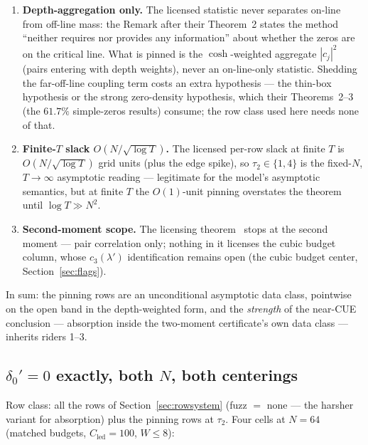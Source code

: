 \documentclass[11pt]{article}
\theoremstyle{plain}
\theoremstyle{definition}
\theoremstyle{remark}
\newcommand{\Cled}{C_{\mathrm{led}}}
\begin{document}
\begin{enumerate}
\item \textbf{Depth-aggregation only.} The licensed statistic never separates
  on-line from off-line mass: the Remark after their Theorem~2 states the method
  ``neither requires nor provides any information'' about whether the zeros are on
  the critical line. What is pinned is the $\cosh$-weighted aggregate $|c_j|^2$
  (pairs entering with depth weights), never an on-line-only statistic. Shedding
  the far-off-line coupling term costs an extra hypothesis --- the thin-box
  hypothesis or the strong zero-density hypothesis, which their Theorems~2--3 (the
  $61.7\%$ simple-zeros results) consume; the row class used here needs none of
  that.
\item \textbf{Finite-$T$ slack $O(N/\sqrt{\log T})$.} The licensed per-row slack
  at finite $T$ is $O(N/\sqrt{\log T})$ grid units (plus the edge spike), so
  $\tau_2 \in \{1, 4\}$ is the fixed-$N$, $T \to \infty$ asymptotic reading ---
  legitimate for the model's asymptotic semantics, but at finite $T$ the
  $O(1)$-unit pinning overstates the theorem until $\log T \gg N^2$.
\item \textbf{Second-moment scope.} The licensing theorem~\cite{BGSTB24} stops at
  the second moment --- pair
  correlation only; nothing in it licenses the cubic budget column, whose
  $c_3(\lambda')$ identification remains open (the cubic budget center,
  Section~\ref{sec:flags}).
\end{enumerate}

In sum: the pinning rows are an unconditional asymptotic data class, pointwise
on the open band in the depth-weighted form, and the \emph{strength} of the
near-CUE conclusion --- absorption inside the two-moment certificate's own data
class --- inherits riders 1--3.

\subsection[delta\_0' = 0 exactly, both N, both centerings]{$\delta_0' = 0$
exactly, both $N$, both centerings}
\label{sec:t2result}

Row class: all the rows of Section~\ref{sec:rowsystem} (fuzz $=$ none --- the
harsher variant for absorption)
plus the pinning rows at $\tau_2$. Four cells at $N = 64$ (matched budgets,
$\Cled = 100$, $W \le 8$):
\end{document}

